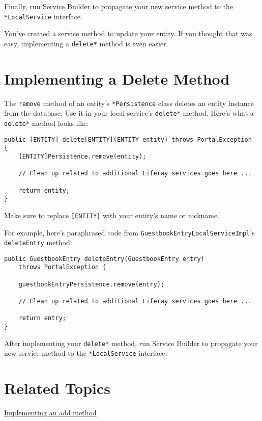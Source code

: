 Finally, run Service Builder to propagate your new service method to the
\texttt{*LocalService} interface.

You've created a service method to update your entity. If you thought
that was easy, implementing a \texttt{delete*} method is even easier.

\section{Implementing a Delete
Method}\label{implementing-a-delete-method}

The \texttt{remove} method of an entity's \texttt{*Persistence} class
deletes an entity instance from the database. Use it in your local
service's \texttt{delete*} method. Here's what a \texttt{delete*} method
looks like:

\begin{verbatim}
public [ENTITY] delete[ENTITY](ENTITY entity) throws PortalException
{
    [ENTITY]Persistence.remove(entity);

    // Clean up related to additional Liferay services goes here ... 

    return entity;
}
\end{verbatim}

Make sure to replace \texttt{{[}ENTITY{]}} with your entity's name or
nickname.

For example, here's paraphrased code from
\texttt{GuestbookEntryLocalServiceImpl}'s \texttt{deleteEntry} method:

\begin{verbatim}
public GuestbookEntry deleteEntry(GuestbookEntry entry)
    throws PortalException {

    guestbookEntryPersistence.remove(entry);

    // Clean up related to additional Liferay services goes here ...  

    return entry;
}
\end{verbatim}

After implementing your \texttt{delete*} method, run Service Builder to
propagate your new service method to the \texttt{*LocalService}
interface.

\section{Related Topics}\label{related-topics-18}

\href{/docs/7-2/appdev/-/knowledge_base/a/implementing-an-add-method}{Implementing
an add method}

